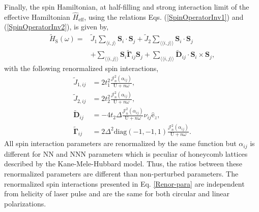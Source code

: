 \documentclass[aps,prl,twocolumn,amsmath,amssymb,nobibnotes]{revtex4-1}%
\newcommand{\n}{\nonumber}
\newcommand{\bs}{\boldsymbol}
\begin{document}
Finally, the spin Hamiltonian, at half-filling and strong interaction limit of the effective Hamiltonian $\hat{H}_{\text{eff}}$, using the relations Eqs. (\ref{SpinOperatorInv1}) and (\ref{SpinOperatorInv2}), is given by,
\begin{align}
\label{MKMHeffw}
\tilde{H}_{\text{S}}(\omega) =& \tilde{J}_{1}\sum_{\langle i,j \rangle} \bs{S}_i\cdot\bs{S}_j + \tilde{J}_{2}\sum_{\langle \langle i,j \rangle \rangle} \bs{S}_i\cdot\bs{S}_j\n \\
&+ \sum_{\langle \langle i,j \rangle \rangle} \bs{S}_i \tilde{\bs{\Gamma}}_{ij} \bs{S}_j +\sum_{\langle \langle i,j \rangle \rangle} \tilde{\bs{D}}_{ij}\cdot \bs{S}_i \times \bs{S}_j,
\end{align}
with the following renormalized spin interactions,
\begin{align}
\label{Renor-para}
\tilde{J}_{1,ij} &= 2t_1^2\frac{\mathcal{J}_{n}^2(\alpha_{ij})}{\text{U}+n\omega}, \\
\tilde{J}_{2,ij} &= 2t_2^2\frac{\mathcal{J}_{n}^2(\alpha_{ij})}{\text{U}+n\omega}, \\
\tilde{\bs{D}}_{ij} &= - 4 t_2 \Delta \frac{\mathcal{J}_{n}^2(\alpha_{ij})}{\text{U}+n\omega} \nu_{ij} \hat{\mathrm{e}}_z, \\
\tilde{\bs{\Gamma}}_{ij} &= 2\Delta^2 \text{diag}(-1,-1,1) \frac{\mathcal{J}_{n}^2(\alpha_{ij})}{\text{U}+n\omega}.
\end{align}
All spin interaction parameters are renormalized by the same function but $\alpha_{ij}$ is different for NN and NNN parameters which is peculiar of honeycomb lattices described by the Kane-Mele-Hubbard model. Thus, the ratios between these renormalized parameters are different than non-perturbed parameters. The renormalized spin interactions presented in Eq. \ref{Renor-para} are independent from helicity of laser pulse and are the same for both circular and linear polarizations.
\end{document}
